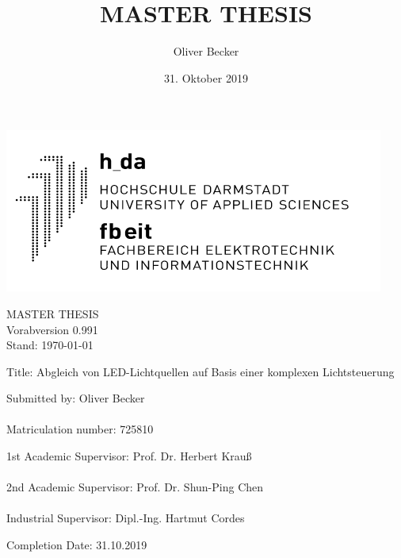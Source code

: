 \documentclass[11pt]{scrartcl}
\title{MASTER THESIS}
\author{Oliver Becker}
\date{31. Oktober 2019} %
\begin{document}
\par\vspace{-1cm}
\begin{flushright}
    \includegraphics[width=0.4\linewidth]{images/logo.png}
\end{flushright}
\vspace{1cm}\noindent
\begin{center}
    \huge MASTER THESIS\\
    \huge \color{red} Vorabversion 0.991\\
    \large Stand: \today
\end{center}
\vspace{1cm}\noindent
{\large Title:  Abgleich von LED-Lichtquellen auf Basis einer komplexen Lichtsteuerung}
\par\vspace{3cm}\noindent
Submitted by: \hspace{2cm}             Oliver Becker\\
\\
Matriculation number:  \hspace{.6cm}   725810\\
\par\vspace{2cm}\noindent
1st Academic Supervisor: \hspace{.2cm} Prof. Dr. Herbert Krauß\\
\\
2nd Academic Supervisor: \hspace{.05cm} Prof. Dr. Shun-Ping Chen\\
\\
Industrial Supervisor:   \hspace{.75cm} Dipl.-Ing. Hartmut Cordes\\
\par\vspace{2cm}\noindent
Completion Date: \hspace{1.5cm}         31.10.2019
\clearpage
\end{document}
